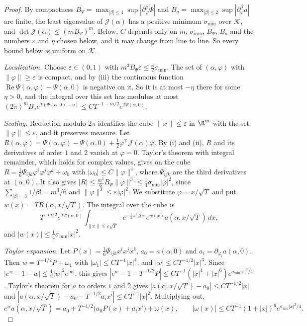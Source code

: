 \begin{proof}
By compactness
$B_\Psi=\max_{|\beta|\le4}\sup|\partial^\beta_\varphi\Psi|$ and
$B_a=\max_{|\beta|\le2}\sup|\partial^\beta_\varphi a|$ are finite, the least
eigenvalue of $\mathcal J(\alpha)$ has a positive minimum $\sigma_{\min}$ over
$\mathcal K$, and $\det\mathcal J(\alpha)\le(mB_\Psi)^m$. Below, $C$ depends
only on $m$, $\sigma_{\min}$, $B_\Psi$, $B_a$ and the numbers $\varepsilon$ and
$\eta$ chosen below, and it may change from line to line. So every bound
below is uniform on $\mathcal K$.

\emph{Localization.} Choose $\varepsilon\in(0,1)$ with
$m^3B_\Psi\varepsilon\le\frac32\sigma_{\min}$. The set of $(\alpha,\varphi)$ with
$\lVert\varphi\rVert\ge\varepsilon$ is compact, and by (iii) the continuous
function $\operatorname{Re}\Psi(\alpha,\varphi)-\Psi(\alpha,0)$ is negative on
it. So it is at most $-\eta$ there for some $\eta>0$, and the integral over
this set has modulus at most
$(2\pi)^mB_ae^{T(\Psi(\alpha,0)-\eta)}\le CT^{-1-m/2}e^{T\Psi(\alpha,0)}$.

\emph{Scaling.} Reduction modulo $2\pi$ identifies the cube
$\lVert x\rVert\le\varepsilon$ in $\R^m$ with the set
$\lVert\varphi\rVert\le\varepsilon$, and it preserves measure. Let
$R(\alpha,\varphi)=\Psi(\alpha,\varphi)-\Psi(\alpha,0)
+\frac12\varphi^\top\mathcal J(\alpha)\varphi$. By (i) and (ii), $R$ and its
derivatives of order $1$ and $2$ vanish at $\varphi=0$. Taylor's theorem with
integral remainder, which holds for complex values, gives on the cube
$R=\frac16\Psi_{ijk}\varphi^i\varphi^j\varphi^k+\omega_0$ with
$|\omega_0|\le C\lVert\varphi\rVert^4$, where $\Psi_{ijk}$ are the third
derivatives at $(\alpha,0)$. It also gives
$|R|\le\frac{m^3}6B_\Psi\lVert\varphi\rVert^3\le\frac14\sigma_{\min}|\varphi|^2$,
since $\sum_{|\beta|=3}1/\beta!=m^3/6$ and
$\lVert\varphi\rVert^3\le\varepsilon|\varphi|^2$. We substitute
$\varphi=x/\sqrt T$ and put $w(x)=TR(\alpha,x/\sqrt T)$. The integral over the
cube is
\[
T^{-m/2}e^{T\Psi(\alpha,0)}\int_{\lVert x\rVert\le\varepsilon\sqrt T}
e^{-\frac12x^\top\mathcal Jx}\,e^{w(x)}a(\alpha,x/\sqrt T)\,dx,
\]
and $|w(x)|\le\frac14\sigma_{\min}|x|^2$.

\emph{Taylor expansion.} Let $P(x)=\frac16\Psi_{ijk}x^ix^jx^k$,
$a_0=a(\alpha,0)$ and $a_i=\partial_{\varphi_i}a(\alpha,0)$. Then
$w=T^{-1/2}P+\omega_1$ with $|\omega_1|\le CT^{-1}|x|^4$, and
$|w|\le CT^{-1/2}|x|^3$. Since $|e^w-1-w|\le\frac12|w|^2e^{|w|}$, this gives
$|e^w-1-T^{-1/2}P|\le CT^{-1}(|x|^4+|x|^6)e^{\sigma_{\min}|x|^2/4}$. Taylor's
theorem for $a$ to orders $1$ and $2$ gives
$|a(\alpha,x/\sqrt T)-a_0|\le CT^{-1/2}|x|$ and
$|a(\alpha,x/\sqrt T)-a_0-T^{-1/2}a_ix^i|\le CT^{-1}|x|^2$. Multiplying out,
\[
e^{w}a(\alpha,x/\sqrt T)=a_0+T^{-1/2}\bigl(a_0P(x)+a_ix^i\bigr)+\omega(x),
\qquad|\omega(x)|\le CT^{-1}(1+|x|)^6e^{\sigma_{\min}|x|^2/4}.
\]


\end{proof}
